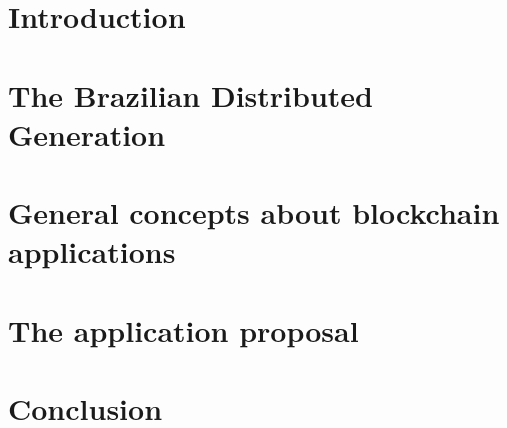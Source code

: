 \documentclass[a4paper,12pt,oneside,onecolumn,final,fleqn]{config/repUERJ}
\begin{document}


\mainmatter




\chapter*{Introduction}
\label{ch:0}


\chapter{The Brazilian Distributed Generation}
\label{ch:1}


\chapter{General concepts about blockchain applications}
\label{ch:2}


\chapter{The application proposal}
\label{ch:3}


\chapter{Conclusion}
\label{ch:final}



\end{document}
